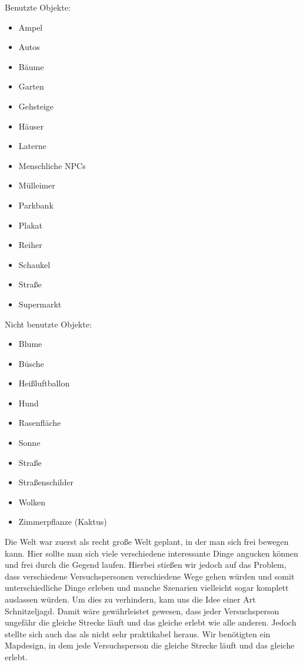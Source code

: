 \documentclass{Bericht}
\begin{document}
	\begin{minipage}[t]{0.5\textwidth}
	\vspace{1mm}
		Benutzte Objekte:
		\begin{itemize}
			\setlength{\itemsep}{0em}
			\item Ampel
			\item Autos
			\item Bäume
			\item Garten
			\item Gehsteige
			\item Häuser
			\item Laterne
			\item Menschliche NPCs
			\item Mülleimer
			\item Parkbank
			\item Plakat
			\item Reiher
			\item Schaukel
			\item Straße
			\item Supermarkt
		\end{itemize}
	\vspace{1mm}
	\end{minipage}
	\begin{minipage}[t]{0.5\textwidth}
	\vspace{1mm}
		Nicht benutzte Objekte:
		\begin{itemize}
			\setlength{\itemsep}{0em}
			\item Blume
			\item Büsche
			\item Heißluftballon
			\item Hund
			\item Rasenfläche
			\item Sonne
			\item Straße
			\item Straßenschilder
			\item Wolken
			\item Zimmerpflanze (Kaktus)
		\end{itemize}
	\vspace{1mm}
	\end{minipage}

		Die Welt war zuerst als recht große Welt geplant, in der man sich frei bewegen kann. Hier sollte man sich viele verschiedene interessante Dinge angucken können und frei durch die Gegend laufen. Hierbei stießen wir jedoch auf das Problem, dass verschiedene Versuchspersonen verschiedene Wege gehen würden und somit unterschiedliche Dinge erleben und manche Szenarien vielleicht sogar komplett auslassen würden. Um dies zu verhindern, kam uns die Idee einer Art Schnitzeljagd. Damit wäre gewährleistet gewesen, dass jeder Versuchsperson ungefähr die gleiche Strecke läuft und das gleiche erlebt wie alle anderen. Jedoch stellte sich auch das als nicht sehr praktikabel heraus. Wir benötigten ein Mapdesign, in dem jede Versuchsperson die gleiche Strecke läuft und das gleiche erlebt.
\end{document}
